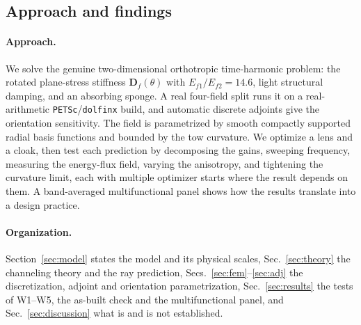 \subsection{Approach and findings}
\paragraph{Approach.} We solve the genuine two-dimensional orthotropic time-harmonic
problem: the rotated plane-stress stiffness $\bm D_f(\theta)$ with
$E_{f1}/E_{f2}=14.6$, light structural damping, and an absorbing sponge. A real
four-field split runs it on a real-arithmetic \texttt{PETSc}/\texttt{dolfinx} build,
and automatic discrete adjoints give the orientation sensitivity. The field is
parametrized by smooth compactly supported radial basis functions and bounded by the
tow curvature. We optimize a lens and a cloak, then test each prediction by
decomposing the gains, sweeping frequency, measuring the energy-flux field, varying the
anisotropy, and tightening the curvature limit, each with multiple optimizer starts where the result depends on
them. A band-averaged multifunctional panel shows how the results translate into a design practice.

\paragraph{Organization.} Section~\ref{sec:model} states the model and its physical scales,
Sec.~\ref{sec:theory} the channeling theory and the ray prediction, Secs.~\ref{sec:fem}--\ref{sec:adj}
the discretization, adjoint and orientation parametrization, Sec.~\ref{sec:results} the tests of
W1--W5, the as-built check and the multifunctional panel, and Sec.~\ref{sec:discussion} what is and is
not established.
